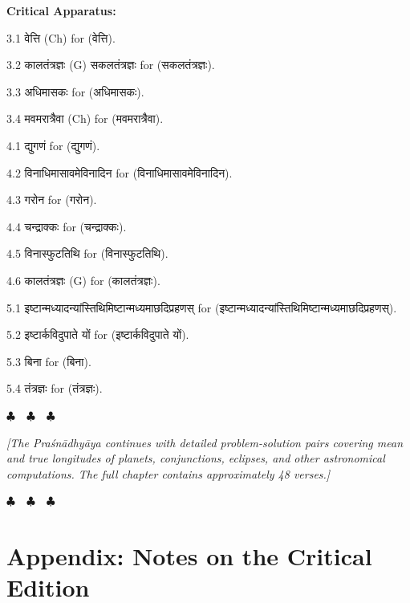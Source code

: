 \documentclass[11pt,a4paper]{article}
\newcommand{\dev}[1]{{\devanagarifont #1}}
\newenvironment{variants}{%
  \small%
  \color{varecolor}%
  \list{}{\leftmargin=2em\itemindent=-1em}%
}{\endlist}
\newcommand{\chapterend}{%
  \begin{center}%
  \textcolor{endmarkcolor}{$\clubsuit$~~$\clubsuit$~~$\clubsuit$}%
  \end{center}%
}
\begin{document}
\vspace{0.4cm}
\textcolor{varecolor}{\textbf{Critical Apparatus:}}
\begin{variants}
\item[3.1] \dev{वेत्ति} (Ch) \dev{for} (\dev{वेत्ति}).
\item[3.2] \dev{कालतंत्रज्ञः} (G) \dev{सकलतंत्रज्ञः} \dev{for} (\dev{सकलतंत्रज्ञः}).
\item[3.3] \dev{अधिमासकः} \dev{for} (\dev{अधिमासकः}).
\item[3.4] \dev{मवमरात्रैवा} (Ch) \dev{for} (\dev{मवमरात्रैवा}).
\item[4.1] \dev{द्युगणं} \dev{for} (\dev{द्युगणं}).
\item[4.2] \dev{विनाधिमासावमेविनादिन} \dev{for} (\dev{विनाधिमासावमेविनादिन}).
\item[4.3] \dev{गरोन} \dev{for} (\dev{गरोन}).
\item[4.4] \dev{चन्द्राक्कः} \dev{for} (\dev{चन्द्राक्कः}).
\item[4.5] \dev{विनास्फुटतिथि} \dev{for} (\dev{विनास्फुटतिथि}).
\item[4.6] \dev{कालतंत्रज्ञः} (G) \dev{for} (\dev{कालतंत्रज्ञः}).
\item[5.1] \dev{इष्टान्मध्यादन्यांस्तिथिमिष्टान्मध्यमाछदिप्रहणस्} \dev{for} (\dev{इष्टान्मध्यादन्यांस्तिथिमिष्टान्मध्यमाछदिप्रहणस्}).
\item[5.2] \dev{इष्टार्कविदुपाते यों} \dev{for} (\dev{इष्टार्कविदुपाते यों}).
\item[5.3] \dev{बिना} \dev{for} (\dev{बिना}).
\item[5.4] \dev{तंत्रज्ञः} \dev{for} (\dev{तंत्रज्ञः}).
\end{variants}

\vspace{0.5cm}
\chapterend
\textit{[The Praśnādhyāya continues with detailed problem-solution pairs covering
mean and true longitudes of planets, conjunctions, eclipses, and other
astronomical computations. The full chapter contains approximately 48 verses.]}
\chapterend

\newpage

\section*{Appendix: Notes on the Critical Edition}
\end{document}
